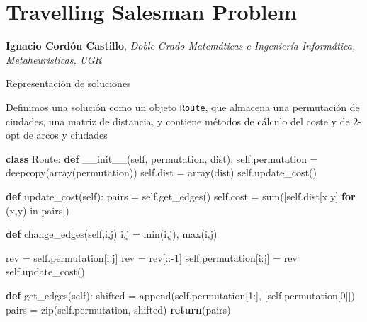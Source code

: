 \documentclass[ignorenonframetext,]{beamer}
\newenvironment{Shaded}{}{}
\newcommand{\KeywordTok}[1]{\textcolor[rgb]{0.00,0.44,0.13}{\textbf{{#1}}}}
\newcommand{\DataTypeTok}[1]{\textcolor[rgb]{0.56,0.13,0.00}{{#1}}}
\newcommand{\DecValTok}[1]{\textcolor[rgb]{0.25,0.63,0.44}{{#1}}}
\newcommand{\OtherTok}[1]{\textcolor[rgb]{0.00,0.44,0.13}{{#1}}}
\newcommand{\NormalTok}[1]{{#1}}
\begin{document}
\section{Travelling Salesman Problem}\label{travelling-salesman-problem}

\textbf{Ignacio Cordón Castillo}, \emph{Doble Grado Matemáticas e
Ingeniería Informática, Metaheurísticas, UGR}

\begin{frame}[fragile]{Representación de soluciones}

Definimos una solución como un objeto \texttt{Route}, que almacena una
permutación de ciudades, una matriz de distancia, y contiene métodos de
cálculo del coste y de 2-opt de arcos y ciudades

\begin{Shaded}
\begin{Highlighting}[]
\KeywordTok{class} \NormalTok{Route:  }
    \KeywordTok{def} \OtherTok{__init__}\NormalTok{(}\OtherTok{self}\NormalTok{, permutation, dist):}
        \OtherTok{self}\NormalTok{.permutation = deepcopy(array(permutation))}
        \OtherTok{self}\NormalTok{.dist = array(dist)}
        \OtherTok{self}\NormalTok{.update_cost()}

    \KeywordTok{def} \NormalTok{update_cost(}\OtherTok{self}\NormalTok{):}
        \NormalTok{pairs = }\OtherTok{self}\NormalTok{.get_edges()}
        \OtherTok{self}\NormalTok{.cost = }\DataTypeTok{sum}\NormalTok{([}\OtherTok{self}\NormalTok{.dist[x,y] }\KeywordTok{for} \NormalTok{(x,y) in pairs])}

    \KeywordTok{def} \NormalTok{change_edges(}\OtherTok{self}\NormalTok{,i,j)}
        \NormalTok{i,j = }\DataTypeTok{min}\NormalTok{(i,j), }\DataTypeTok{max}\NormalTok{(i,j)}

        \NormalTok{rev = }\OtherTok{self}\NormalTok{.permutation[i:j]}
        \NormalTok{rev = rev[::-}\DecValTok{1}\NormalTok{]}
        \OtherTok{self}\NormalTok{.permutation[i:j] = rev}
        \OtherTok{self}\NormalTok{.update_cost()}

    \KeywordTok{def} \NormalTok{get_edges(}\OtherTok{self}\NormalTok{):}
        \NormalTok{shifted = append(}\OtherTok{self}\NormalTok{.permutation[}\DecValTok{1}\NormalTok{:], [}\OtherTok{self}\NormalTok{.permutation[}\DecValTok{0}\NormalTok{]])}
        \NormalTok{pairs = }\DataTypeTok{zip}\NormalTok{(}\OtherTok{self}\NormalTok{.permutation, shifted)}
        \KeywordTok{return}\NormalTok{(pairs)}
            
\end{Highlighting}
\end{Shaded}

\end{frame}
\end{document}
